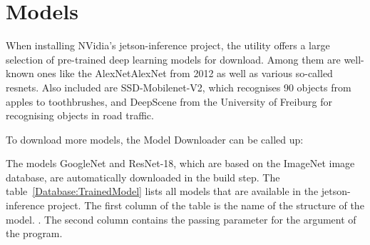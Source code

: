 %
%



\section{Models}

When installing NVidia's jetson-inference project, the utility offers a large selection of pre-trained deep learning models for download. Among them are well-known ones like the AlexNet{AlexNet} from 2012 as well as various so-called \ac{resnets}. Also included are SSD-Mobilenet-V2, which recognises 90 objects from apples to toothbrushes, and DeepScene from the University of Freiburg for recognising objects in road traffic. 

To download more models, the Model Downloader can be called up:

\medskip

 \newline 
{} 

\medskip

The models  GoogleNet and ResNet-18, which are based on the ImageNet image database, are automatically downloaded in the build step. The table~\ref{Database:TrainedModel} lists all models that are available in the jetson-inference project. The first column of the table is the name of the structure of the model. \cite{Alom:2018}. The second column contains the passing parameter for the  argument of the  program.

\medskip

